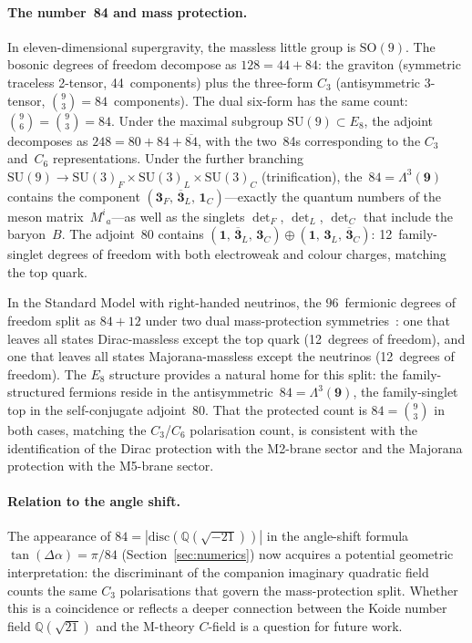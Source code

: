 \documentclass[12pt,a4paper]{article}
\newcommand{\SU}{\mathrm{SU}}
\begin{document}
\paragraph{The number~84 and mass protection.}
In eleven-dimensional supergravity, the massless little group is
$\mathrm{SO}(9)$.  The bosonic degrees of freedom decompose as
$128 = 44 + 84$: the graviton (symmetric traceless 2-tensor,
44~components) plus the three-form $C_3$ (antisymmetric 3-tensor,
$\binom{9}{3} = 84$~components).  The dual six-form has the same
count: $\binom{9}{6} = \binom{9}{3} = 84$.  Under the maximal
subgroup $\SU(9) \subset E_8$, the adjoint decomposes as
$248 = 80 + 84 + \overline{84}$, with the two~84s corresponding
to the $C_3$ and~$C_6$ representations.
Under the further branching $\SU(9) \to \SU(3)_F \times \SU(3)_L
\times \SU(3)_C$ (trinification), the~$84 = \Lambda^3(\mathbf{9})$
contains the component
$(\mathbf{3}_F,\,\overline{\mathbf{3}}_L,\,\mathbf{1}_C)$---exactly
the quantum numbers of the meson matrix~$M^i{}_a$---as well as the
singlets $\det_F$, $\det_L$, $\det_C$ that include the baryon~$B$.
The adjoint~80 contains
$(\mathbf{1},\,\overline{\mathbf{3}}_L,\,\mathbf{3}_C) \oplus
(\mathbf{1},\,\mathbf{3}_L,\,\overline{\mathbf{3}}_C)$:
12~family-singlet degrees of freedom with both electroweak and
colour charges, matching the top quark.

In the Standard Model with right-handed neutrinos, the
$96$~fermionic degrees of freedom split as $84 + 12$ under two
dual mass-protection
symmetries~\cite{Rivero:2024epjc}:
one that leaves all states Dirac-massless except the
top quark (12~degrees of freedom), and one that leaves all states
Majorana-massless except the neutrinos (12~degrees of freedom).
The $E_8$ structure provides a natural home for this split:
the family-structured fermions reside in the
antisymmetric~$84 = \Lambda^3(\mathbf{9})$, the family-singlet top
in the self-conjugate adjoint~$80$.
That the protected count is $84 = \binom{9}{3}$ in both cases,
matching the $C_3$/$C_6$ polarisation count, is consistent with the
identification of the Dirac protection with the M2-brane sector
and the Majorana protection with the M5-brane sector.

\paragraph{Relation to the angle shift.}
The appearance of $84 = |\mathrm{disc}(\mathbb{Q}(\sqrt{-21}))|$
in the angle-shift formula $\tan(\Delta\alpha) = \pi/84$
(Section~\ref{sec:numerics}) now acquires a potential geometric
interpretation: the discriminant of the companion imaginary
quadratic field counts the same $C_3$ polarisations that govern
the mass-protection split.  Whether this is a coincidence or
reflects a deeper connection between the Koide number field
$\mathbb{Q}(\sqrt{21})$ and the M-theory $C$-field is a question
for future work.
\end{document}
